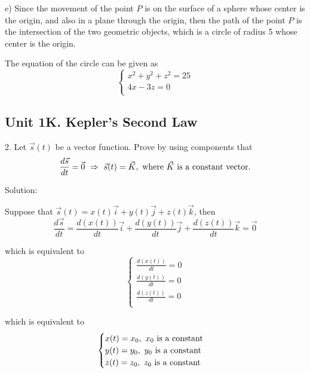 \documentclass{article}
\begin{document}
e) Since the movement of the point $P$ is on the surface of a sphere whose 
center is the origin, and also in a plane through the origin, then the path of 
the point $P$ is the intersection of the two geometric objects, which is a 
circle of radius 5 whose center is the origin.

The equation of the circle can be given as
\begin{equation*}
  \begin{cases}
    x^2 + y^2 + z^2 = 25 \\
    4x - 3z = 0 \\
  \end{cases}
\end{equation*}

\subsection*{Unit 1K. Kepler's Second Law}

\bigskip

2. Let $\vec{s}(t)$ be a vector function. Prove by using components that
\begin{equation*}
  \frac{d\vec{s}}{dt} = \vec{0} \ \Rightarrow \ \vec{s}(t) = \vec{K},\ \textnormal{where $\vec{K}$ is a constant vector.}
\end{equation*}

Solution:

Suppose that $\vec{s}(t) = x(t) \vec{i} + y(t) \vec{j} + z(t) \vec{k}$, then
\begin{equation*}
  \frac{d\vec{s}}{dt} = \frac{d(x(t))}{dt} \vec{i} + \frac{d(y(t))}{dt} \vec{j} + \frac{d(z(t))}{dt} \vec{k} = \vec{0}
\end{equation*}

which is equivalent to
\begin{equation*}
  \begin{cases}
    \frac{d(x(t))}{dt} = 0 \\
    \frac{d(y(t))}{dt} = 0 \\
    \frac{d(z(t))}{dt} = 0 \\
  \end{cases}
\end{equation*}

which is equivalent to
\begin{equation*}
  \begin{cases}
    x(t) = x_0,\ \textnormal{$x_0$ is a constant} \\
    y(t) = y_0,\ \textnormal{$y_0$ is a constant} \\
    z(t) = z_0,\ \textnormal{$z_0$ is a constant} \\
  \end{cases}
\end{equation*}
\end{document}
